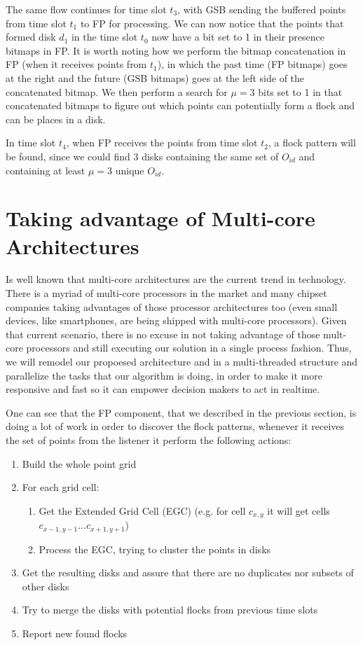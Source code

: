 The same flow continues for time slot $t_3$, with GSB sending the buffered points from time slot $t_1$ to FP for
processing. We can now notice that the points that formed disk $d_1$ in the time slot $t_0$ now have a bit set to 1 in
their presence bitmaps in FP. It is worth noting how we perform the bitmap concatenation in FP (when it receives points
from $t_1$), in which the past time (FP bitmaps) goes at the right and the future (GSB bitmaps) goes at the left side of
the concatenated bitmap. We then perform a search for $\mu = 3$ bits set to 1 in that concatenated bitmaps to figure out
which points can potentially form a flock and can be places in a disk.

In time slot $t_4$, when FP receives the points from time slot $t_2$, a flock pattern will be found, since we could find
3 disks containing the same set of $O_{id}$ and containing at least $\mu = 3$ unique $O_{id}$.

\section{Taking advantage of Multi-core Architectures}
\label{sec:multithread}
Is well known that multi-core architectures are the current trend in technology. There is a myriad of multi-core
processors in the market and many chipset companies taking advantages of those processor architectures too (even small
devices, like smartphones, are being shipped with multi-core processors). Given that current scenario, there is no
excuse in not taking advantage of those mult-core processors and still executing our solution in a single process
fashion. Thus, we will remodel our propoesed architecture and in a multi-threaded structure and parallelize the tasks
that our algorithm is doing, in order to make it more responsive and fast so it can empower decision makers to act in
realtime.

One can see that the FP component, that we described in the previous section, is doing a lot of work in order to
discover the flock patterns, whenever it receives the set of points from the listener it perform the following actions:

\begin{enumerate}
    \item Build the whole point grid
    \item For each grid cell:
    \begin{enumerate}
        \item Get the Extended Grid Cell (EGC) (e.g. for cell $c_{x,y}$ it will get cells
            $c_{x - 1, y - 1}...c_{x + 1, y+ 1}$)
        \item Process the EGC, trying to cluster the points in disks
    \end{enumerate}
    \item Get the resulting disks and assure that there are no duplicates nor subsets of other disks
    \item Try to merge the disks with potential flocks from previous time slots
    \item Report new found flocks
\end{enumerate}

